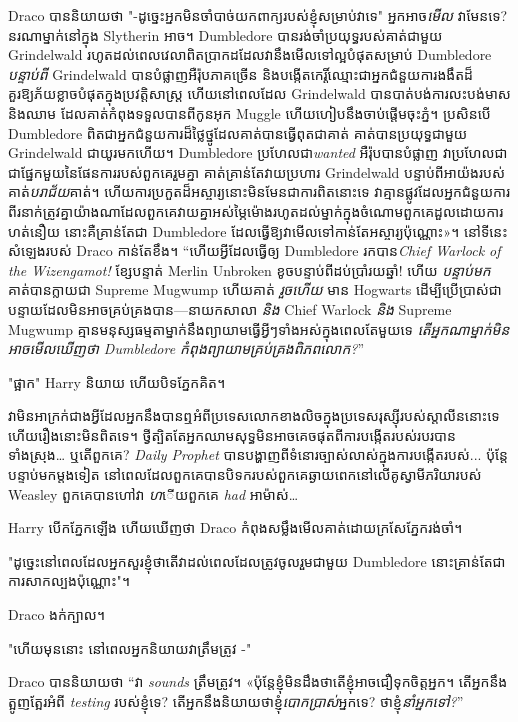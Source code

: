 {{{{{Draco បាននិយាយថា "-ដូច្នេះអ្នកមិនចាំបាច់យកពាក្យរបស់ខ្ញុំសម្រាប់វាទេ" អ្នកអាច\emph{មើល} វាមែនទេ? នរណាម្នាក់នៅក្នុង Slytherin អាច។ Dumbledore បានរង់ចាំប្រយុទ្ធរបស់គាត់ជាមួយ Grindelwald រហូតដល់ពេលវេលាពិតប្រាកដដែលវានឹងមើលទៅល្អបំផុតសម្រាប់ Dumbledore \emph{បន្ទាប់ពី} Grindelwald បានបំផ្លាញអឺរ៉ុបភាគច្រើន និងបង្កើតកេរ្តិ៍ឈ្មោះជាអ្នកជំនួយការងងឹតដ៏គួរឱ្យភ័យខ្លាចបំផុតក្នុងប្រវត្តិសាស្ត្រ ហើយនៅពេលដែល Grindelwald បានបាត់បង់ការលះបង់មាស និងឈាម ដែលគាត់កំពុងទទួលបានពីកូនអុក Muggle ហើយហៀបនឹងចាប់ផ្តើមចុះភ្នំ។ ប្រសិនបើ Dumbledore ពិតជាអ្នកជំនួយការដ៏ថ្លៃថ្នូដែលគាត់បានធ្វើពុតជាគាត់ គាត់បានប្រយុទ្ធជាមួយ Grindelwald ជាយូរមកហើយ។ Dumbledore ប្រហែលជា\emph{wanted} អឺរ៉ុបបានបំផ្លាញ វាប្រហែលជាជាផ្នែកមួយនៃផែនការរបស់ពួកគេរួមគ្នា គាត់គ្រាន់តែវាយប្រហារ Grindelwald បន្ទាប់ពីអាយ៉ងរបស់គាត់\emph{បរាជ័យ}គាត់។ ហើយ​ការ​ប្រកួត​ដ៏​អស្ចារ្យ​នោះ​មិន​មែន​ជា​ការ​ពិត​នោះ​ទេ វា​គ្មាន​ផ្លូវ​ដែល​អ្នក​ជំនួយការ​ពីរ​នាក់​ត្រូវ​គ្នា​យ៉ាង​ណា​ដែល​ពួក​គេ​វាយ​គ្នា​អស់​ម្ភៃ​ម៉ោង​រហូត​ដល់​ម្នាក់​ក្នុង​ចំណោម​ពួក​គេ​ដួល​ដោយ​ការ​ហត់នឿយ នោះ​គឺ​គ្រាន់​តែ​ជា Dumbledore ដែល​ធ្វើ​ឱ្យ​វា​មើល​ទៅ​កាន់​តែ​អស្ចារ្យ​ប៉ុណ្ណោះ»។ នៅទីនេះ សំឡេងរបស់ Draco កាន់តែខឹង។ “ហើយអ្វីដែលធ្វើឲ្យ Dumbledore រកបាន\emph{Chief Warlock of the Wizengamot!} ខ្សែបន្ទាត់ Merlin Unbroken ខូចបន្ទាប់ពីដប់ប្រាំរយឆ្នាំ! ហើយ \emph{បន្ទាប់មក} គាត់បានក្លាយជា Supreme Mugwump ហើយគាត់ \emph{រួចហើយ} មាន Hogwarts ដើម្បីប្រើប្រាស់ជាបន្ទាយដែលមិនអាចគ្រប់គ្រងបាន—នាយកសាលា \emph{និង} Chief Warlock \emph{និង} Supreme Mugwump គ្មានមនុស្សធម្មតាម្នាក់នឹងព្យាយាមធ្វើអ្វីៗទាំងអស់ក្នុងពេលតែមួយទេ \emph{តើអ្នកណាម្នាក់មិនអាចមើលឃើញថា Dumbledore កំពុងព្យាយាមគ្រប់គ្រងពិភពលោក?}”

"ផ្អាក" Harry និយាយ ហើយបិទភ្នែកគិត។

វា​មិន​អាក្រក់​ជាង​អ្វី​ដែល​អ្នក​នឹង​បាន​ឮ​អំពី​ប្រទេស​លោក​ខាង​លិច​ក្នុង​ប្រទេស​រុស្ស៊ី​របស់​ស្តាលីន​នោះ​ទេ ហើយ​រឿង​នោះ​មិន​ពិត​ទេ។ ថ្វីត្បិតតែអ្នកឈាមសុទ្ធមិនអាចគេចផុតពីការបង្កើតរបស់របរបានទាំងស្រុង… ឬតើពួកគេ? \emph{Daily Prophet} បានបង្ហាញពីទំនោរច្បាស់លាស់ក្នុងការបង្កើតរបស់... ប៉ុន្តែបន្ទាប់មកម្តងទៀត នៅពេលដែលពួកគេបានបិទករបស់ពួកគេឆ្ងាយពេកនៅលើគូស្វាមីភរិយារបស់ Weasley ពួកគេបានហៅវា \emph ហើយពួកគេ \emph{had} អាម៉ាស់…

Harry បើកភ្នែកឡើង ហើយឃើញថា Draco កំពុងសម្លឹងមើលគាត់ដោយក្រសែភ្នែករង់ចាំ។

"ដូច្នេះនៅពេលដែលអ្នកសួរខ្ញុំថាតើវាដល់ពេលដែលត្រូវចូលរួមជាមួយ Dumbledore នោះគ្រាន់តែជាការសាកល្បងប៉ុណ្ណោះ"។

Draco ងក់ក្បាល។

"ហើយមុននោះ នៅពេលអ្នកនិយាយវាត្រឹមត្រូវ -"

Draco បាននិយាយថា “វា \emph{sounds} ត្រឹមត្រូវ។ «​ប៉ុន្តែ​ខ្ញុំ​មិន​ដឹង​ថា​តើ​ខ្ញុំ​អាច​ជឿ​ទុក​ចិត្ត​អ្នក​។ តើអ្នកនឹងត្អូញត្អែរអំពី \emph{testing} របស់ខ្ញុំទេ? តើអ្នកនឹងនិយាយថាខ្ញុំ\emph{បោកប្រាស់}អ្នកទេ? ថាខ្ញុំ\emph{នាំអ្នកទៅ?}”

}}}}}
